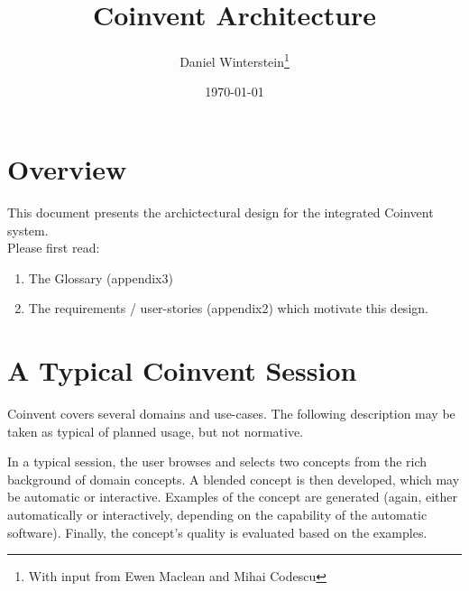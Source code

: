 \documentclass[10pt]{article}
\author{Daniel Winterstein\footnote{With input from Ewen Maclean and Mihai Codescu}}
\title{Coinvent Architecture}
\date{\today}
\begin{document}
\maketitle





\section{Overview}\label{sec:overview}

This document presents the archictectural design for the integrated Coinvent system. \mbox{}\\
Please first read:
\begin{enumerate}
\item{The Glossary (appendix3)}
\item{The requirements / user-stories (appendix2) which motivate this design.}
\end{enumerate}

\section{A Typical Coinvent Session}\label{sec:typical}

Coinvent covers several domains and use-cases. The following description may be taken
as typical of planned usage, but not normative.

In a typical session, the user browses and selects two concepts from the 
rich background of domain concepts. A blended concept is then developed, which
may be automatic or interactive. Examples of the concept are generated (again, either
automatically or interactively, depending on the capability of the automatic software). Finally, the concept's quality is evaluated based on the examples.
\end{document}
